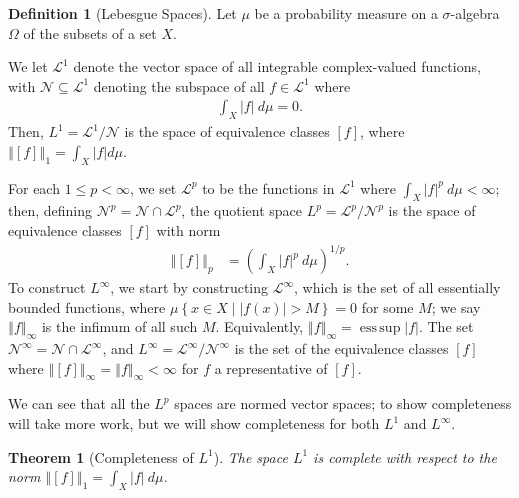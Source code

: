 \documentclass[12pt]{extarticle}
\newcommand{\norm}[1]{\left\Vert #1\right\Vert}
\newcommand{\set}[1]{\left\{#1\right\}}
\DeclareMathOperator*{\esssup}{ess\,sup}
\theoremstyle{plain}
\newtheorem*{theorem}{Theorem}
\theoremstyle{definition}
\newtheorem*{definition}{Definition}
\theoremstyle{note}
\renewcommand{\newline}{\hfill\break}
\begin{document}
\begin{definition}[Lebesgue Spaces]
  Let $\mu$ be a probability measure on a $\sigma$-algebra $\Omega$ of the subsets of a set $X$.\newline

  We let $\mathcal{L}^{1}$ denote the vector space of all integrable complex-valued functions, with $\mathcal{N}\subseteq \mathcal{L}^{1}$ denoting the subspace of all $f\in \mathcal{L}^{1}$ where
  \begin{align*}
    \int_{X}^{} \left\vert f \right\vert\:d\mu = 0.
  \end{align*}
  Then, $L^{1} = \mathcal{L}^{1}/\mathcal{N}$ is the space of equivalence classes $[f]$, where $\norm{[f]}_{1} = \int_{X}|f|d\mu$.\newline

  For each $1 \leq p < \infty$, we set $\mathcal{L}^{p}$ to be the functions in $\mathcal{L}^{1}$ where $\int_{X}|f|^{p}\:d\mu < \infty$; then, defining $\mathcal{N}^{p} = \mathcal{N}\cap \mathcal{L}^{p}$, the quotient space $L^{p} = \mathcal{L}^{p}/\mathcal{N}^{p}$ is the space of equivalence classes $[f]$ with norm
  \begin{align*}
    \norm{[f]}_{p} &= \left(\int_{X}^{} |f|^{p}\:d\mu\right)^{1/p}.
  \end{align*}
  To construct $L^{\infty}$, we start by constructing $\mathcal{L}^{\infty}$, which is the set of all essentially bounded functions, where $\mu\set{x\in X\mid |f(x)| > M} = 0$ for some $M$; we say $\norm{f}_{\infty}$ is the infimum of all such $M$. Equivalently, $\norm{f}_{\infty} = \esssup |f|$. The set $\mathcal{N}^{\infty} = \mathcal{N}\cap \mathcal{L}^{\infty}$, and $L^{\infty} = \mathcal{L}^{\infty}/\mathcal{N}^{\infty}$ is the set of the equivalence classes $[f]$ where $\norm{[f]}_{\infty} = \norm{f}_{\infty} < \infty$ for $f$ a representative of $[f]$.\newline

  We can see that all the $L^{p}$ spaces are normed vector spaces; to show completeness will take more work, but we will show completeness for both $L^{1}$ and $L^{\infty}$.
\end{definition}
\begin{theorem}[Completeness of $L^{1}$]
  The space $L^{1}$ is complete with respect to the norm $\norm{[f]}_1 = \int_{X}|f|\:d\mu$.
\end{theorem}
\end{document}
